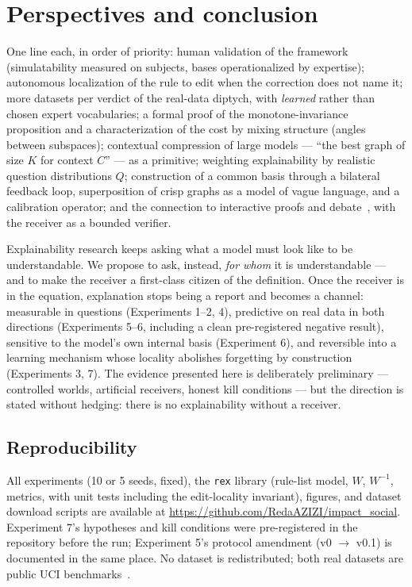 \documentclass[10pt]{article}
\theoremstyle{definition}
\theoremstyle{plain}
\begin{document}
\section{Perspectives and conclusion}
\label{sec:conclusion}

One line each, in order of priority: human validation of the framework (simulatability measured on subjects, bases operationalized by expertise); autonomous localization of the rule to edit when the correction does not name it; more datasets per verdict of the real-data diptych, with \emph{learned} rather than chosen expert vocabularies; a formal proof of the monotone-invariance proposition and a characterization of the cost by mixing structure (angles between subspaces); contextual compression of large models --- ``the best graph of size $K$ for context $C$'' --- as a primitive; weighting explainability by realistic question distributions $Q$; construction of a common basis through a bilateral feedback loop, superposition of crisp graphs as a model of vague language, and a calibration operator; and the connection to interactive proofs and debate~\citep{irving2018ai}, with the receiver as a bounded verifier.

Explainability research keeps asking what a model must look like to be understandable. We propose to ask, instead, \emph{for whom} it is understandable --- and to make the receiver a first-class citizen of the definition. Once the receiver is in the equation, explanation stops being a report and becomes a channel: measurable in questions (Experiments 1--2, 4), predictive on real data in both directions (Experiments 5--6, including a clean pre-registered negative result), sensitive to the model's own internal basis (Experiment 6), and reversible into a learning mechanism whose locality abolishes forgetting by construction (Experiments 3, 7). The evidence presented here is deliberately preliminary --- controlled worlds, artificial receivers, honest kill conditions --- but the direction is stated without hedging: there is no explainability without a receiver.

\subsection*{Reproducibility}
\label{sec:repro}

All experiments (10 or 5 seeds, fixed), the \texttt{rex} library (rule-list model, $W$, $W^{-1}$, metrics, with unit tests including the edit-locality invariant), figures, and dataset download scripts are available at \url{https://github.com/RedaAZIZI/impact_social}. Experiment 7's hypotheses and kill conditions were pre-registered in the repository before the run; Experiment 5's protocol amendment (v0 $\to$ v0.1) is documented in the same place. No dataset is redistributed; both real datasets are public UCI benchmarks~\citep{hofmann1994statlog,matzka2020explainable}.
\end{document}
